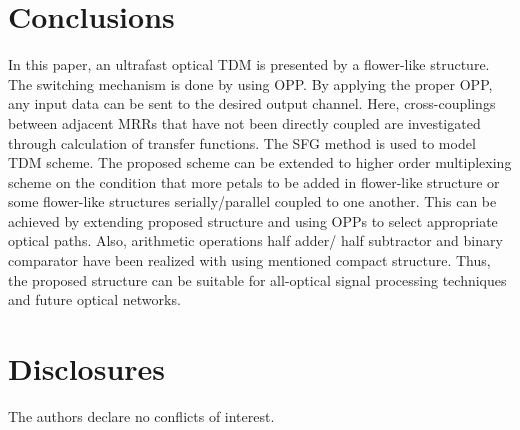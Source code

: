 \documentclass{osa-article}
\begin{document}
\section{Conclusions}
\label{}
In this paper, an ultrafast optical TDM is presented by a flower-like structure. The switching mechanism is done by using OPP. By applying the proper OPP, any input data can be sent to the desired output channel. Here, cross-couplings between adjacent MRRs that have not been directly coupled are investigated through calculation of transfer functions. The SFG method is used to model TDM scheme. The proposed scheme can be extended to higher order multiplexing scheme on the condition that more petals to be added in flower-like structure or some flower-like structures serially/parallel coupled to one another. This can be achieved by extending proposed structure and using OPPs to select appropriate optical paths. Also, arithmetic operations half adder/ half subtractor and binary comparator have been realized with using mentioned compact structure. Thus, the proposed structure can be suitable for all-optical signal processing techniques and future optical networks.
\section*{Disclosures}
The authors declare no conflicts of interest.

\appendix
\end{document}
